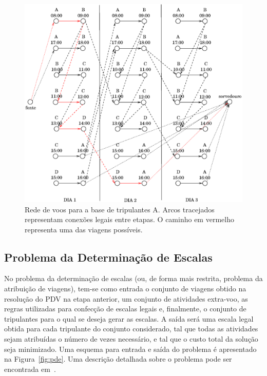 \documentclass[12pt,a4paper]{article}
\begin{document}
\begin{figure}[htbp]
	\begin{center}
		\includegraphics[scale=0.65]{fig/rede.eps}
		\caption{Rede de voos para a base de tripulantes A. Arcos tracejados representam conexões legais
		entre etapas. O caminho em vermelho representa uma das viagens possíveis.}
		\label{fig:rede}
	\end{center}
\end{figure}

\subsection{Problema da Determinação de Escalas}
\label{sec:escalas}

No problema da determinação de escalas (ou, de forma mais restrita, problema da atribuição de
viagens), tem-se como entrada o conjunto de viagens obtido na resolução do PDV na etapa anterior, um
conjunto de atividades extra-voo, as regras utilizadas para confecção de escalas legais e,
finalmente, o conjunto de tripulantes para o qual se deseja gerar as escalas. A saída será uma
escala legal obtida para cada tripulante do conjunto considerado, tal que todas as atividades sejam
atribuídas o número de vezes necessário, e tal que o custo total da solução seja minimizado. Uma
esquema para entrada e saída do problema é apresentado na Figura~\ref{fig:pde}. Uma descrição 
detalhada sobre o problema pode ser encontrada em~\cite{kohl04}.
\end{document}
